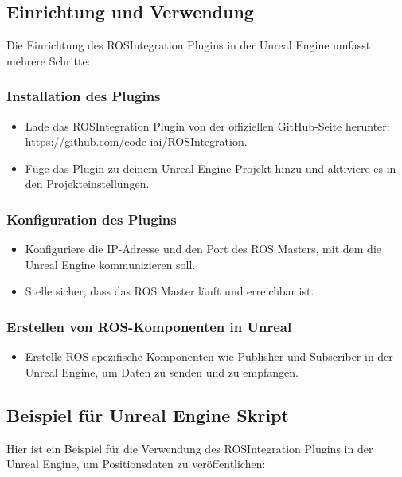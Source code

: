 \subsection{Einrichtung und Verwendung}

Die Einrichtung des ROSIntegration Plugins in der Unreal Engine umfasst mehrere Schritte:

\subsubsection{Installation des Plugins}

\begin{itemize}
    \item Lade das ROSIntegration Plugin von der offiziellen GitHub-Seite herunter: \url{https://github.com/code-iai/ROSIntegration}.
    \item Füge das Plugin zu deinem Unreal Engine Projekt hinzu und aktiviere es in den Projekteinstellungen.
\end{itemize}

\subsubsection{Konfiguration des Plugins}

\begin{itemize}
    \item Konfiguriere die IP-Adresse und den Port des ROS Masters, mit dem die Unreal Engine kommunizieren soll.
    \item Stelle sicher, dass das ROS Master läuft und erreichbar ist.
\end{itemize}

\subsubsection{Erstellen von ROS-Komponenten in Unreal}

\begin{itemize}
    \item Erstelle ROS-spezifische Komponenten wie Publisher und Subscriber in der Unreal Engine, um Daten zu senden und zu empfangen.
\end{itemize}

\subsection{Beispiel für Unreal Engine Skript}

Hier ist ein Beispiel für die Verwendung des ROSIntegration Plugins in der Unreal Engine, um Positionsdaten zu veröffentlichen:

